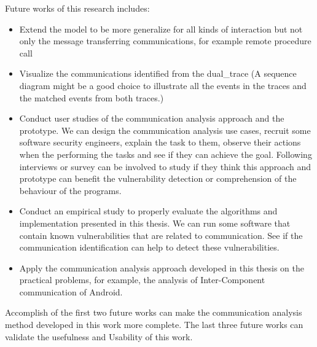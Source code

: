 Future works of this research includes:
\begin{itemize}
\item Extend the model to be more generalize for all kinds of interaction but not only the message transferring communications, for example remote procedure call
\item Visualize the communications identified from the dual\_trace (A sequence diagram might be a good choice to illustrate all the events in the traces and the matched events from both traces.) 
\item Conduct user studies of the communication analysis approach and the prototype. We can design the communication analysis use cases, recruit some software security engineers, explain the task to them, observe their actions when the performing the tasks and see if they can achieve the goal. Following interviews or survey can be involved to study if they think this approach and prototype can benefit the vulnerability detection or comprehension of the behaviour of the programs.
\item Conduct an empirical study to properly evaluate the algorithms and implementation presented in this thesis. We can run some software that contain known vulnerabilities that are related to communication. See if the communication identification can help to detect these vulnerabilities.
\item Apply the communication analysis approach developed in this thesis on the practical problems, for example, the analysis of Inter-Component communication of Android. 
\end{itemize}

Accomplish of the first two future works can make the communication analysis method developed in this work more complete. The last three future works can validate the usefulness and Usability of this work.


